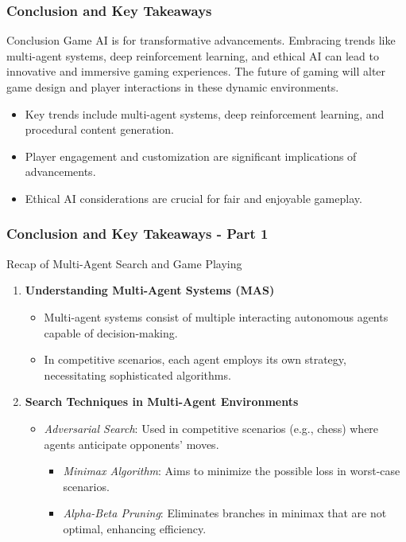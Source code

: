 \documentclass[aspectratio=169]{beamer}
\begin{document}
\begin{frame}[fragile]
    \frametitle{Conclusion and Key Takeaways}
    \begin{block}{Conclusion}
        Game AI is for transformative advancements. Embracing trends like multi-agent systems, deep reinforcement learning, and ethical AI can lead to innovative and immersive gaming experiences. The future of gaming will alter game design and player interactions in these dynamic environments.
    \end{block}

    \begin{itemize}
        \item Key trends include multi-agent systems, deep reinforcement learning, and procedural content generation.
        \item Player engagement and customization are significant implications of advancements.
        \item Ethical AI considerations are crucial for fair and enjoyable gameplay.
    \end{itemize}
\end{frame}

\begin{frame}[fragile]
  \frametitle{Conclusion and Key Takeaways - Part 1}
  \begin{block}{Recap of Multi-Agent Search and Game Playing}
    \begin{enumerate}
      \item \textbf{Understanding Multi-Agent Systems (MAS)}
        \begin{itemize}
          \item Multi-agent systems consist of multiple interacting autonomous agents capable of decision-making.
          \item In competitive scenarios, each agent employs its own strategy, necessitating sophisticated algorithms.
        \end{itemize}

      \item \textbf{Search Techniques in Multi-Agent Environments}
        \begin{itemize}
          \item \textit{Adversarial Search}: Used in competitive scenarios (e.g., chess) where agents anticipate opponents' moves.
            \begin{itemize}
              \item \textit{Minimax Algorithm}: Aims to minimize the possible loss in worst-case scenarios.
              \item \textit{Alpha-Beta Pruning}: Eliminates branches in minimax that are not optimal, enhancing efficiency.
            \end{itemize}
        \end{itemize}
    \end{enumerate}
  \end{block}
\end{frame}
\end{document}
